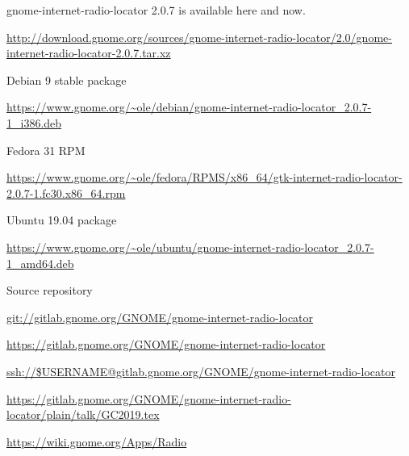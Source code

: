 \documentclass[20pt,landscape]{foils}
\begin{document}
\begin{list1}
\item gnome-internet-radio-locator 2.0.7 is available here and now.
  \begin{list2}
  \item \begin{tiny}\url{http://download.gnome.org/sources/gnome-internet-radio-locator/2.0/gnome-internet-radio-locator-2.0.7.tar.xz}\end{tiny}
  \end{list2}
\item Debian 9 stable package
  \begin{list2}
  \item \begin{tiny}\url{https://www.gnome.org/~ole/debian/gnome-internet-radio-locator_2.0.7-1_i386.deb}\end{tiny}
  \end{list2}
\item Fedora 31 RPM
  \begin{list2}
  \item \begin{tiny}\url{https://www.gnome.org/~ole/fedora/RPMS/x86_64/gtk-internet-radio-locator-2.0.7-1.fc30.x86_64.rpm}\end{tiny}
  \end{list2}
\item Ubuntu 19.04 package
  \begin{list2}
  \item \begin{tiny}\url{https://www.gnome.org/~ole/ubuntu/gnome-internet-radio-locator_2.0.7-1_amd64.deb}\end{tiny}
  \end{list2}
\item Source repository
  \begin{list2}
    \item \url{git://gitlab.gnome.org/GNOME/gnome-internet-radio-locator}
    \item \url{https://gitlab.gnome.org/GNOME/gnome-internet-radio-locator}
    \item \url{ssh://$USERNAME@gitlab.gnome.org/GNOME/gnome-internet-radio-locator}
  \end{list2}
\end{list1}


\url{https://gitlab.gnome.org/GNOME/gnome-internet-radio-locator/plain/talk/GC2019.tex}


\url{https://wiki.gnome.org/Apps/Radio}
\end{document}
